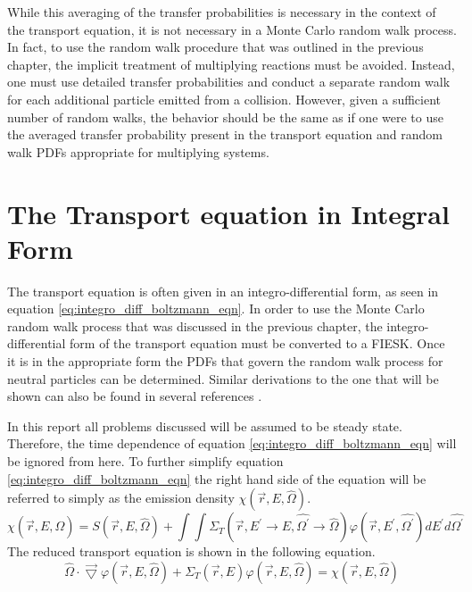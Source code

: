 While this averaging of the transfer probabilities is necessary in the context 
of the transport equation, it is not necessary in a Monte Carlo random walk 
process. In fact, to use the random walk procedure that was outlined in the 
previous chapter, the implicit treatment of multiplying reactions must be 
avoided. Instead, one must use detailed transfer probabilities and conduct 
a separate random walk for each additional particle emitted from a collision. 
However, given a sufficient number of random walks, the behavior should be the 
same as if one were to use the averaged transfer probability present in the 
transport equation and random walk PDFs appropriate for multiplying systems. 

\section{The Transport equation in Integral Form}
The transport equation is often given in an integro-differential form, as seen 
in equation \ref{eq:integro_diff_boltzmann_eqn}. In order to use the Monte 
Carlo random walk process that was discussed in the previous chapter, the 
integro-differential form of the transport equation must be converted to a 
FIESK. Once it is in the appropriate form the PDFs that govern the random walk 
process for neutral particles can be determined. Similar derivations to the one 
that will be shown can also be found in several references \citep{lewis_computational_1993, hoogenboom_adjoint_1977, irving_adjoint_1971, bell_nuclear_1979}.
 
In this report all problems discussed will be assumed to be steady state. 
Therefore, the time dependence of equation \ref{eq:integro_diff_boltzmann_eqn} 
will be ignored from here. To further simplify equation 
\ref{eq:integro_diff_boltzmann_eqn} the right hand side of the equation will be 
referred to simply as the emission density $\chi(\vec{r},E,\hat{\Omega})$.
\begin{equation}
    \chi(\vec{r},E,\hat{\Omega}) = S(\vec{r},E,\hat{\Omega}) +
    \int\int \Sigma_T(\vec{r},E^{'} \to E,\hat{\Omega^{'}} \to \hat{\Omega})
    \varphi(\vec{r},E^{'},\hat{\Omega^{'}}) dE^{'}d\hat{\Omega^{'}}
  \label{eq:emission_density}
\end{equation}
The reduced transport equation is shown in the following equation.
\begin{equation}
  \hat{\Omega} \cdot \vec{\bigtriangledown} \varphi(\vec{r},E,\hat{\Omega})
  + \Sigma_T(\vec{r},E) \varphi(\vec{r},E,\hat{\Omega}) =  
 \chi(\vec{r},E,\hat{\Omega})
  \label{eq:reduced_transport_eqn}
\end{equation}

